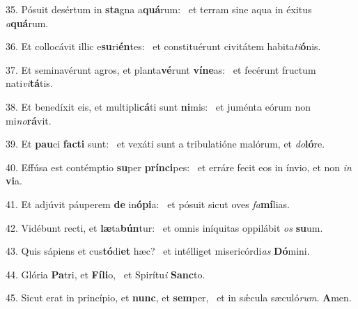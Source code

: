 35. Pósuit desértum in \textbf{sta}gna a\textbf{quá}rum: \ast\  et terram sine aqua in éxitus \textit{a}\textbf{quá}rum.\

36. Et collocávit illic e\textbf{su}ri\textbf{én}tes: \ast\  et constituérunt civitátem habita\textit{ti}\textbf{ó}nis.\

37. Et seminavérunt agros, et planta\textbf{vé}runt \textbf{ví}\textbf{ne}as: \ast\  et fecérunt fructum nati\textit{vi}\textbf{tá}tis.\

38. Et benedíxit eis, et multipli\textbf{cá}ti sunt \textbf{ni}mis: \ast\  et juménta eórum non mi\textit{no}\textbf{rá}vit.\

39. Et \textbf{pau}ci \textbf{fac}\textbf{ti} sunt: \ast\  et vexáti sunt a tribulatióne malórum, et \textit{do}\textbf{ló}re.\

40. Effúsa est contémptio \textbf{su}per \textbf{prín}\textbf{ci}pes: \ast\  et erráre fecit eos in ínvio, et non \textit{in} \textbf{vi}a.\

41. Et adjúvit páuperem \textbf{de} in\textbf{ó}\textbf{pi}a: \ast\  et pósuit sicut oves \textit{fa}\textbf{mí}lias.\

42. Vidébunt recti, et \textbf{læ}ta\textbf{bún}tur: \ast\  et omnis iníquitas oppilábit \textit{os} \textbf{su}um.\

43. Quis sápiens et cus\textbf{tó}di\textbf{et} hæc? \ast\  et intélliget misericórdi\textit{as} \textbf{Dó}mini.\

44. Glória \textbf{Pa}tri, et \textbf{Fí}\textbf{li}o, \ast\  et Spirítu\textit{i} \textbf{Sanc}to.\

45. Sicut erat in princípio, et \textbf{nunc}, et \textbf{sem}per, \ast\  et in sǽcula sæculó\textit{rum}. \textbf{A}men.\

